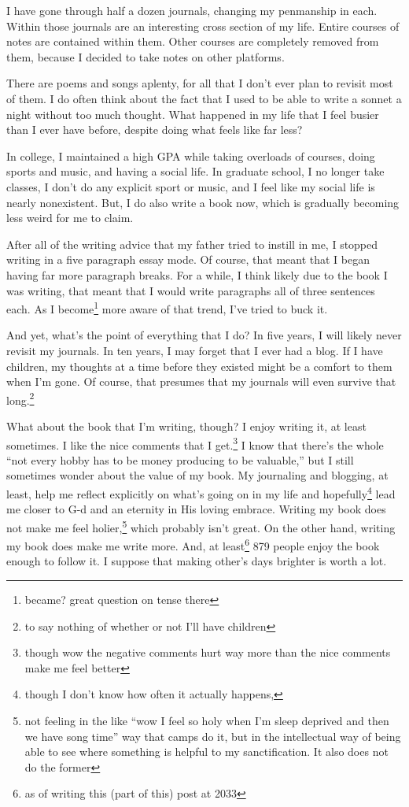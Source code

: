 \documentclass[12pt]{article}[titlepage]
\newcommand{\say}[1]{``#1''}
\renewcommand{\,}{\textsuperscript{,}}
\begin{document}
I have gone through half a dozen journals, changing my penmanship in each.
Within those journals are an interesting cross section of my life.
Entire courses of notes are contained within them.
Other courses are completely removed from them, because I decided to take notes on other platforms.

There are poems and songs aplenty, for all that I don't ever plan to revisit most of them.
I do often think about the fact that I used to be able to write a sonnet a night without too much thought.
What happened in my life that I feel busier than I ever have before, despite doing what feels like far less?

In college, I maintained a high GPA while taking overloads of courses, doing sports and music, and having a social life.
In graduate school, I no longer take classes, I don't do any explicit sport or music, and I feel like my social life is nearly nonexistent.
But, I do also write a book now, which is gradually becoming less weird for me to claim.

After all of the writing advice that my father tried to instill in me, I stopped writing in a five paragraph essay mode.
Of course, that meant that I began having far more paragraph breaks.
For a while, I think likely due to the book I was writing, that meant that I would write paragraphs all of three sentences each.
As I become\footnote{became? great question on tense there} more aware of that trend, I've tried to buck it.

And yet, what's the point of everything that I do?
In five years, I will likely never revisit my journals.
In ten years, I may forget that I ever had a blog.
If I have children, my thoughts at a time before they existed might be a comfort to them when I'm gone.
Of course, that presumes that my journals will even survive that long.\footnote{to say nothing of whether or not I'll have children}

What about the book that I'm writing, though?
I enjoy writing it, at least sometimes.
I like the nice comments that I get.\footnote{though wow the negative comments hurt way more than the nice comments make me feel better}
I know that there's the whole \say{not every hobby has to be money producing to be valuable,} but I still sometimes wonder about the value of my book.
My journaling and blogging, at least, help me reflect explicitly on what's going on in my life and hopefully\footnote{though I don't know how often it actually happens,} lead me closer to G-d and an eternity in His loving embrace.
Writing my book does not make me feel holier,\footnote{not feeling in the like \say{wow I feel so holy when I'm sleep deprived and then we have song time} way that camps do it, but in the intellectual way of being able to see where something is helpful to my sanctification. It also does not do the former} which probably isn't great.
On the other hand, writing my book does make me write more.
And, at least\footnote{as of writing this (part of this) post at 2033} 879 people enjoy the book enough to follow it.
I suppose that making other's days brighter is worth a lot.
\end{document}
